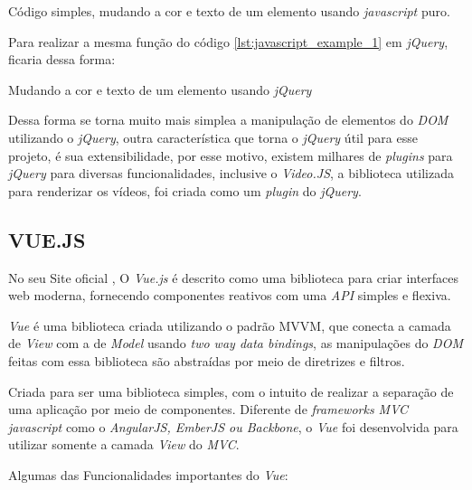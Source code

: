 \begin{listing}[H]
    \caption{Código simples, mudando a cor e texto de um elemento usando \textit{javascript} puro.}
    \label{lst:javascript_example_1}
\end{listing}
Para realizar a mesma função do código \ref{lst:javascript_example_1} em \textit{jQuery}, ficaria dessa forma:
\begin{listing}[H]
      \caption{Mudando a cor e texto de um elemento usando \textit{jQuery}}
      \label{lst:jquery_example_1}
\end{listing}
\par
Dessa forma se torna muito mais simplea a manipulação de elementos do \textit{DOM} utilizando o \textit{jQuery}, outra característica que torna o \textit{jQuery} útil para esse projeto, é sua extensibilidade, por esse motivo, existem milhares de \textit{plugins} para \textit{jQuery} para diversas funcionalidades, inclusive o \textit{Video.JS}, a biblioteca utilizada para renderizar os vídeos, foi criada como um \textit{plugin} do \textit{jQuery}.

\subsection{VUE.JS}

No seu Site oficial , O \textit{Vue.js} é descrito como uma biblioteca para criar interfaces web moderna, fornecendo componentes reativos com uma \textit{API} simples e flexiva.
\par
\textit{Vue} é uma biblioteca criada utilizando o padrão \ac{MVVM}, que conecta a camada de \textit{View} com a de \textit{Model} usando \textit{two way data bindings}, as manipulações do \textit{DOM} feitas com essa biblioteca são abstraídas por meio de diretrizes e filtros.
\par
Criada para ser uma biblioteca simples, com o intuito de realizar a separação de uma aplicação por meio de componentes. Diferente de \textit{frameworks MVC javascript} como o \textit{AngularJS, EmberJS ou Backbone}, o \textit{Vue} foi desenvolvida para utilizar somente a camada \textit{View} do \textit{MVC}.
\par

Algumas das Funcionalidades importantes do \textit{Vue}:

